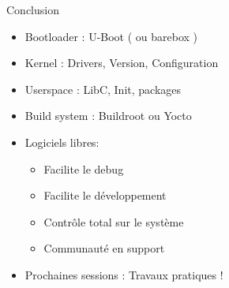 \begin{frame}{Conclusion}
  \begin{itemize}
  \item Bootloader : U-Boot ( ou barebox )
  \item Kernel : Drivers, Version, Configuration
  \item Userspace : LibC, Init, packages
  \item Build system : Buildroot ou Yocto
  \item Logiciels libres:
    \begin{itemize}
    \item Facilite le debug
    \item Facilite le développement
    \item Contrôle total sur le système
    \item Communauté en support
    \end{itemize}
  \item Prochaines sessions : Travaux pratiques !
  \end{itemize}
\end{frame}

